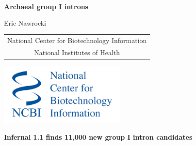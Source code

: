 \documentclass[landscape]{slides}
\begin{document}
\begin{slide}
\begin{center}
\large{\textbf{Archaeal group I introns}}

\normalsize

Eric Nawrocki

\medskip

\medskip

\small

\begin{tabular}{c}
National Center for Biotechnology Information\\
National Institutes of Health\\
\end{tabular}

\vspace{0.1in}

\includegraphics[width=2.5in]{figs/ncbi-logo}

\end{center}
\end{slide}
\begin{slide}
\begin{center}
\textbf{Infernal 1.1 finds 11,000 new group I intron candidates}
\end{center}


\vfill
\end{slide}
\end{document}
